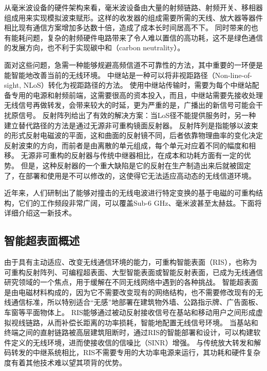 \documentclass[supercite]{HustGraduPaper}
\begin{document}
从毫米波设备的硬件架构来看，毫米波设备由大量的射频链路、射频开关、移相器组成用来实现模拟波束赋形。这样的收发器的组成需要所需的天线、放大器等器件相比现有通信方案增加多达数十倍，造成了成本长时间居高不下。
同时带来的也有能耗问题，复杂的射频硬件电路带来了令人难以置信的高功耗，这不是绿色通信的发展方向，也不利于实现碳中和（carbon neutrality）。

面对这些问题，急需一种能够规避高频信道不可靠性的方法，其中重要的一环便是能智能地改善当前的无线环境。
中继站是一种可以将非视距路径（Non-line-of-sight, NLoS）转化为视距路径的方法\cite{Dohler2010a}。
使用中继站传输时，需要为每个中继站配备专用的电源和射频前端，这需要很高的资本投入，而且，中继站需要先接收处理无线信号再做转发，会带来较大的时延，更为严重的是，广播出的新信号可能会干扰原信号\cite{di2020reconfigurable}。
反射阵列给出了有效的解决方案：当LoS径不能提供服务时，另一种建立替代路径的方法是通过无源非可重构镜面反射器。
反射阵列是指能够以波束的形式反射电磁波的平面\cite{huang2005reflectarray}，这和曲面的反射镜不同，后者依靠物理曲率的变化决定反射波束的方向，而前者是由离散的单元组成，每个单元对应着不同的幅度和相移\cite{pozar1997design}。
无源非可重构的反射器与传统中继器相比，在成本和功耗方面有一定的优势。
但是，这种反射器的一个重大缺陷是它的反射在生产制造出来后就被固定了，在部署和使用是不可以修改的，这使得它无法适应高动态的无线信道环境。

近年来，人们研制出了能够对撞击的无线电波进行特定变换的基于电磁的可重构结构，它们的工作频段非常广阔，可以覆盖Sub-6 GHz、毫米波甚至太赫兹\cite{Wu2019}。下面将详细介绍这一新技术。

\subsection{智能超表面概述}

由于具有主动适应、改变无线通信环境的能力，可重构智能表面（RIS），也称为可重构反射阵列、可编程超表面、大型智能表面或智能反射表面，已成为无线通信研究领域的一个焦点，用于缓解在不同无线网络中遇到的各种挑战\cite{liu2020ris, huang2020holographic}。
智能超表面是由电磁材料构成的，因为它不需要改变现有的网络结构，也不需要修改现有的无线通信标准，所以特别适合“无感”地部署在建筑物外墙、公路指示牌、广告面板、车窗等平面物体上。
RIS能够通过被动反射接收信号在基站和移动用户之间形成虚拟视线链路，从而补偿长距离的功率损耗，智能地配置无线信号环境。
当基站和终端之间的直射链路被高层建筑阻断时，通过RIS的智能部署和设计，可以构建软件定义的无线环境，进而使接收信的信噪比（SINR）增强。
与传统放大转发和解码转发的中继系统相比，RIS不需要专用的大功率电源来运行，其功耗和硬件复杂度有着其他技术难以望其项背的优势\cite{di2020reconfigurable}。
\end{document}
